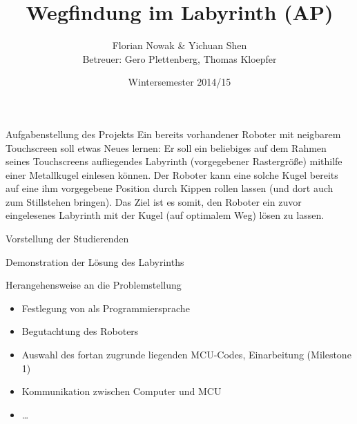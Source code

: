 \documentclass{beamer}
\title{Wegfindung im Labyrinth (AP)}
\author{\texorpdfstring{Florian Nowak \& Yichuan Shen\\ Betreuer: Gero Plettenberg, Thomas Kloepfer}{Florian Nowak \& Yichuan Shen}}
\date{Wintersemester 2014/15}
\begin{document}
\maketitle

\begin{frame}[fragile,t]{Aufgabenstellung des Projekts}
Ein bereits vorhandener Roboter mit neigbarem Touchscreen soll etwas Neues lernen: Er soll ein beliebiges auf dem Rahmen seines Touchscreens aufliegendes Labyrinth (vorgegebener Rastergröße) mithilfe einer Metallkugel einlesen können. Der Roboter kann eine solche Kugel bereits auf eine ihm vorgegebene Position durch Kippen rollen lassen (und dort auch zum Stillstehen bringen). Das Ziel ist es somit, den Roboter ein zuvor eingelesenes Labyrinth mit der Kugel (auf optimalem Weg) lösen zu lassen. 

\medskip\noindent
{}
\end{frame}

\begin{frame}[fragile,t]{Vorstellung der Studierenden}
\end{frame}

\begin{frame}[fragile,t]{Demonstration der Lösung des Labyrinths}
\end{frame}

\begin{frame}[fragile,t]{Herangehensweise an die Problemstellung}
\begin{itemize}
\item Festlegung von  als Programmiersprache
\item Begutachtung des Roboters
\item Auswahl des fortan zugrunde liegenden MCU-Codes, Einarbeitung (Milestone 1)
\item Kommunikation zwischen Computer und MCU
\item \ldots
\end{itemize}
\end{frame}
\end{document}
